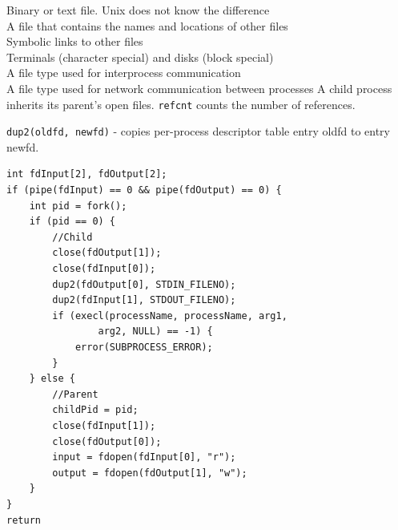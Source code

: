 \documentclass[number]{notes}
\begin{document}
\begin{landscape}
\begin{multicols}{3}
Binary or text file. Unix does not know the difference\\
A file that contains the names and locations of other files\\
Symbolic links to other files\\
Terminals (character special) and disks (block special)\\
A file type used for interprocess communication\\
A file type used for network communication between processes
A child process inherits its parent's open files. \texttt{refcnt} counts the number of references.

\texttt{dup2(oldfd, newfd)} - copies per-process descriptor table entry oldfd to entry newfd.
\begin{minipage}{\linewidth}
\begin{lstlisting}
int fdInput[2], fdOutput[2];
if (pipe(fdInput) == 0 && pipe(fdOutput) == 0) {
    int pid = fork();
    if (pid == 0) {
        //Child
        close(fdOutput[1]);
        close(fdInput[0]);
        dup2(fdOutput[0], STDIN_FILENO);
        dup2(fdInput[1], STDOUT_FILENO);
        if (execl(processName, processName, arg1,
                arg2, NULL) == -1) {
            error(SUBPROCESS_ERROR);
        }
    } else {
        //Parent
        childPid = pid;
        close(fdInput[1]);
        close(fdOutput[0]);
        input = fdopen(fdInput[0], "r");
        output = fdopen(fdOutput[1], "w");
    }
}
return
\end{lstlisting}
\end{minipage}

\end{multicols}
\end{landscape}
\end{document}
